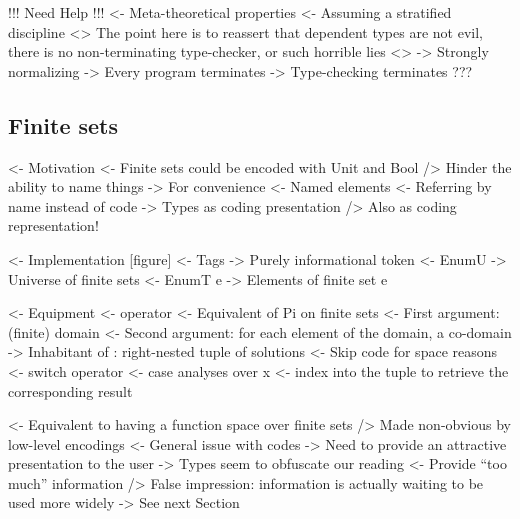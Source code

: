 \documentclass{article}
\newenvironment{structure}{\footnotesize\verbatim}{\endverbatim}
\begin{document}
\begin{structure}
!!! Need Help !!!
<- Meta-theoretical properties
    <- Assuming a stratified discipline
    <> The point here is to reassert that dependent types are not evil, 
       there is no non-terminating type-checker, or such horrible lies <>
    -> Strongly normalizing
        -> Every program terminates
    -> Type-checking terminates
    ???
\end{structure}

\subsection{Finite sets}

\begin{structure}
<- Motivation
    <- Finite sets could be encoded with Unit and Bool
        /> Hinder the ability to name things
    -> For convenience
        <- Named elements
        <- Referring by name instead of code
        -> Types as coding presentation
            /> Also as coding representation!
\end{structure}

\begin{structure}
<- Implementation [figure]      
    <- Tags
        -> Purely informational token
    <- EnumU
        -> Universe of finite sets
    <- EnumT e
        -> Elements of finite set e
\end{structure}

\begin{structure}
<- Equipment
    <- \spi operator
        <- Equivalent of Pi on finite sets
        <- First argument: (finite) domain
        <- Second argument: for each element of the domain, a co-domain
        -> Inhabitant of \spi: right-nested tuple of solutions
            <- Skip code for space reasons
    <- switch operator
        <- case analyses over x
        <- index into the \spi tuple to retrieve the corresponding result
\end{structure}

\begin{structure}
<- Equivalent to having a function space over finite sets
    /> Made non-obvious by low-level encodings
        <- General issue with codes
             -> Need to provide an attractive presentation to the user
    -> Types seem to obfuscate our reading
        <- Provide ``too much'' information
        /> False impression: information is actually waiting to be used more widely
        -> See next Section
\end{structure}
\end{document}
